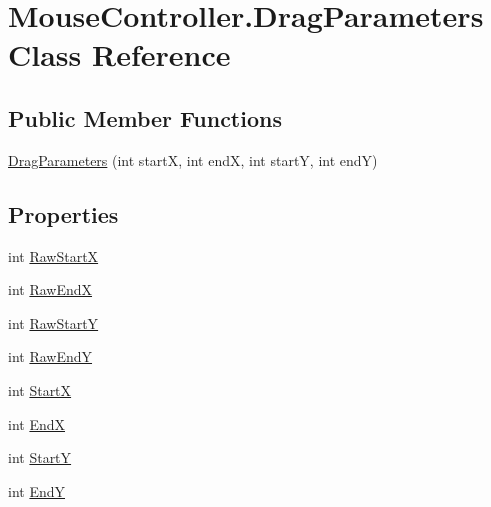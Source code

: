 \hypertarget{class_mouse_controller_1_1_drag_parameters}{}\section{Mouse\+Controller.\+Drag\+Parameters Class Reference}
\label{class_mouse_controller_1_1_drag_parameters}
\subsection*{Public Member Functions}
\begin{DoxyCompactItemize}
\item 
\hyperlink{class_mouse_controller_1_1_drag_parameters_a2e6a08c9135e303d430b7b0c8d8c9a9d}{Drag\+Parameters} (int startX, int endX, int startY, int endY)
\end{DoxyCompactItemize}
\subsection*{Properties}
\begin{DoxyCompactItemize}
\item 
int \hyperlink{class_mouse_controller_1_1_drag_parameters_a29bdcd865b3e1dfc11ee23e1c485ed8a}{Raw\+StartX}
\item 
int \hyperlink{class_mouse_controller_1_1_drag_parameters_a372c74a0623686c41c30e7f744bbd38d}{Raw\+EndX}
\item 
int \hyperlink{class_mouse_controller_1_1_drag_parameters_ac0506797d9e40d97eb40c1598523f91c}{Raw\+StartY}
\item 
int \hyperlink{class_mouse_controller_1_1_drag_parameters_a120c419cbd39482166a84e70c51641fe}{Raw\+EndY}
\item 
int \hyperlink{class_mouse_controller_1_1_drag_parameters_aa620197e5c734a99c82568cac44b75c2}{StartX}
\item 
int \hyperlink{class_mouse_controller_1_1_drag_parameters_ab9d8d0a036421e59f26fd0c7154aa42e}{EndX}
\item 
int \hyperlink{class_mouse_controller_1_1_drag_parameters_a175944afab130905b4357e06132a7026}{StartY}
\item 
int \hyperlink{class_mouse_controller_1_1_drag_parameters_a59f078dd0aa6f0cac74ced533d0b1410}{EndY}
\end{DoxyCompactItemize}


